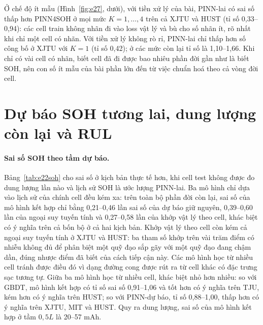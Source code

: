 \documentclass[12pt,a4paper,oneside]{report}
\theoremstyle{plain}
\theoremstyle{definition}
\begin{document}
Ở chế độ ít mẫu (Hình~\ref{fig:e27}, dưới), với tiền xử lý của bài, PINN-lai có sai số thấp hơn PINN4SOH ở mọi mức $K = 1, \dots, 4$ trên cả XJTU và HUST (tỉ số 0{,}33--0{,}94): các
cell train không nhãn đi vào loss vật lý và bù cho số nhãn ít, rõ nhất khi chỉ một cell có nhãn. Với tiền xử lý không rò
rỉ, PINN-lai chỉ thấp hơn số công bố ở XJTU với $K = 1$ (tỉ số 0{,}42); ở các mức còn lại tỉ số là 1{,}10--1{,}66. Khi chỉ có vài cell có nhãn, biết cell đã đi được bao nhiêu phần đời gần như là biết SOH, nên con số ít
mẫu của bài phần lớn đến từ việc chuẩn hoá theo cả vòng đời cell.

\section{Dự báo SOH tương lai, dung lượng còn lại và RUL}\label{sec:forecastres}

\paragraph{Sai số SOH theo tầm dự báo.} Bảng~\ref{tab:e22soh} cho sai số ở kịch bản
thực tế hơn, khi cell test không được đo dung lượng lần nào và lịch sử SOH là ước lượng PINN-lai. Ba mô hình chỉ dựa
vào lịch sử của chính cell đều kém xa: trên toàn bộ phần đời còn lại, sai số của mô hình kết hợp chỉ bằng
0{,}21--0{,}46 lần sai số của dự báo giữ nguyên, 0{,}39--0{,}60 lần của ngoại suy tuyến tính và 0{,}27--0{,}58 lần của khớp vật lý theo
cell, khác biệt có ý nghĩa trên cả bốn bộ ở cả hai kịch bản. Khớp vật lý theo cell còn kém cả ngoại suy tuyến tính ở XJTU và HUST: ba tham số khớp trên vài trăm điểm có
nhiễu không đủ để phân biệt một quỹ đạo sắp gãy với một quỹ đạo đang chậm dần, đúng nhược điểm đã biết của cách tiếp
cận này. Các mô hình học từ nhiều cell tránh được điều đó vì dạng đường cong được rút ra từ cell khác có đặc trưng
sạc tương tự. Giữa ba mô hình học từ nhiều cell, khác biệt nhỏ hơn nhiều: so với GBDT, mô hình kết hợp có tỉ số sai
số 0{,}91--1{,}06 và tốt hơn có ý nghĩa trên TJU, kém hơn có ý nghĩa trên HUST; so với PINN-dự báo, tỉ số 0{,}88--1{,}00, thấp hơn có ý nghĩa trên XJTU, MIT và HUST. Quy ra dung lượng, sai số của mô hình kết hợp
ở tầm $0{,}5L$ là 20--57 mAh.
\end{document}
